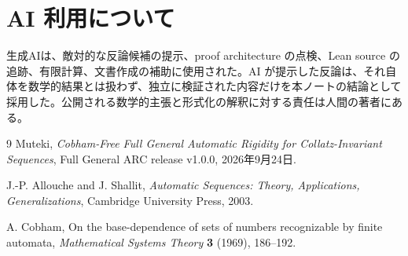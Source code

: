 \documentclass[a4paper,11pt]{ltjsarticle}
\begin{document}
\section*{AI 利用について}

生成AIは、敵対的な反論候補の提示、proof architecture の点検、Lean source の追跡、有限計算、文書作成の補助に使用された。AI が提示した反論は、それ自体を数学的結果とは扱わず、独立に検証された内容だけを本ノートの結論として採用した。公開される数学的主張と形式化の解釈に対する責任は人間の著者にある。

\begin{thebibliography}{9}
Muteki,
\emph{Cobham-Free Full General Automatic Rigidity for Collatz-Invariant Sequences},
Full General ARC release v1.0.0, 2026年9月24日.

J.-P. Allouche and J. Shallit,
\emph{Automatic Sequences: Theory, Applications, Generalizations},
Cambridge University Press, 2003.

A. Cobham,
On the base-dependence of sets of numbers recognizable by finite automata,
\emph{Mathematical Systems Theory} \textbf{3} (1969), 186--192.
\end{thebibliography}
\end{document}

